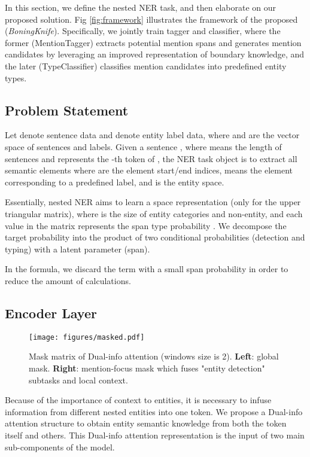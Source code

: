 \documentclass[11pt,a4paper]{article}
\begin{document}
In this section, we define the nested NER task, and then elaborate on our proposed solution.
Fig \ref{fig:framework} illustrates the framework of the proposed (\textit{BoningKnife}).
Specifically, we jointly train tagger and classifier, where the former (MentionTagger) extracts potential mention spans and generates mention candidates by leveraging an improved representation of boundary knowledge, and the later (TypeClassifier) classifies mention candidates into predefined entity types.

\subsection{Problem Statement}
\label{subsec:problem}

Let  denote sentence data and  denote entity label data, where  and  are the vector space of sentences and labels.
Given a sentence , where  means the length of sentences  and  represents the -th token of , the NER task object is to extract all semantic elements  where  are the element start/end indices,  means the element corresponding to a predefined label, and  is the entity space.

Essentially, nested NER aims to learn a  space representation (only for the upper triangular matrix), where  is the size of entity categories and non-entity, and each value in the matrix represents the span type probability .
We decompose the target probability  into the product of two conditional probabilities (detection and typing) with a latent parameter (span).


In the formula, we discard the term with a small span probability  in order to reduce the amount of calculations.

\subsection{Encoder Layer}
\label{subsec:encoder_layer}

\begin{figure}[t]
    \begin{center}
    \texttt{[image: figures/masked.pdf]}
    \caption{Mask matrix of Dual-info attention (windows size is 2). \textbf{Left}: global mask. \textbf{Right}: mention-focus mask which fuses "entity detection" subtasks and local context.}
    \label{fig:masked}
    \end{center}
\end{figure}

Because of the importance of context to entities, it is necessary to infuse information from different nested entities into one token. We propose a Dual-info attention structure to obtain entity semantic knowledge from both the token itself and others. This Dual-info attention representation is the input of two main sub-components of the model.
\end{document}

